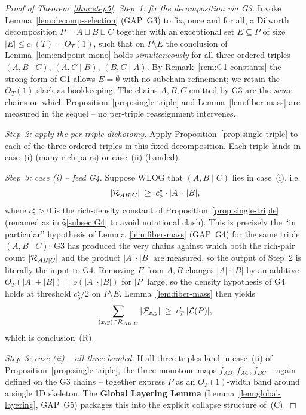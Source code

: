 \begin{proof}[Proof of Theorem~\ref{thm:step5}]
\emph{Step~1: fix the decomposition via G3.} Invoke
Lemma~\ref{lem:decomp-selection} (GAP~G3) to fix, once and for all, a
Dilworth decomposition $P = A \sqcup B \sqcup C$ together with an
exceptional set $E \subseteq P$ of size $|E| \le c_1(T) = O_T(1)$, such that
on $P \setminus E$ the conclusion of Lemma~\ref{lem:endpoint-mono} holds
\emph{simultaneously} for all three ordered triples $(A,B \mid C)$,
$(A,C \mid B)$, $(B,C \mid A)$. By Remark~\ref{rem:G1-constants} the strong
form of G1 allows $E = \emptyset$ with no subchain refinement; we retain
the $O_T(1)$ slack as bookkeeping. The chains $A, B, C$ emitted by G3 are
the \emph{same} chains on which Proposition~\ref{prop:single-triple} and
Lemma~\ref{lem:fiber-mass} are measured in the sequel -- no per-triple
reassignment intervenes.

\smallskip
\noindent\emph{Step~2: apply the per-triple dichotomy.} Apply
Proposition~\ref{prop:single-triple} to each of the three ordered triples
in this fixed decomposition. Each triple lands in case~(i) (many rich
pairs) or case~(ii) (banded).

\smallskip
\noindent\emph{Step~3: case (i) -- feed G4.} Suppose WLOG that
$(A,B \mid C)$ lies in case~(i), i.e.
\[
|\mathcal{R}_{AB \mid C}| \;\ge\; c_5^\star \cdot |A|\cdot|B|,
\]
where $c_5^\star > 0$ is the rich-density constant of
Proposition~\ref{prop:single-triple} (renamed as in §\ref{subsec:G4} to
avoid notational clash). This is precisely the ``in particular'' hypothesis
of Lemma~\ref{lem:fiber-mass} (GAP~G4) for the same triple
$(A,B \mid C)$: G3 has produced the very chains against which both the
rich-pair count $|\mathcal{R}_{AB \mid C}|$ and the product $|A|\cdot|B|$ are
measured, so the output of Step~2 is literally the input to G4. Removing
$E$ from $A, B$ changes $|A|\cdot|B|$ by an additive
$O_T(|A| + |B|) = o(|A|\cdot|B|)$ for $|P|$ large, so the density
hypothesis of G4 holds at threshold $c_5^\star/2$ on $P \setminus E$.
Lemma~\ref{lem:fiber-mass} then yields
\[
\sum_{(x,y)\in\mathcal{R}_{AB \mid C}} |\mathcal{F}_{x,y}| \;\ge\; c'_T\,|\mathcal{L}(P)|,
\]
which is conclusion~(R).

\smallskip
\noindent\emph{Step~3: case (ii) -- all three banded.} If all three triples
land in case~(ii) of Proposition~\ref{prop:single-triple}, the three
monotone maps $f_{AB}, f_{AC}, f_{BC}$ -- again defined on the G3 chains --
together express $P$ as an $O_T(1)$-width band around a single 1D skeleton.
The \textbf{Global Layering Lemma} (Lemma~\ref{lem:global-layering},
GAP~G5) packages this into the explicit collapse structure of~(C).
\end{proof}

